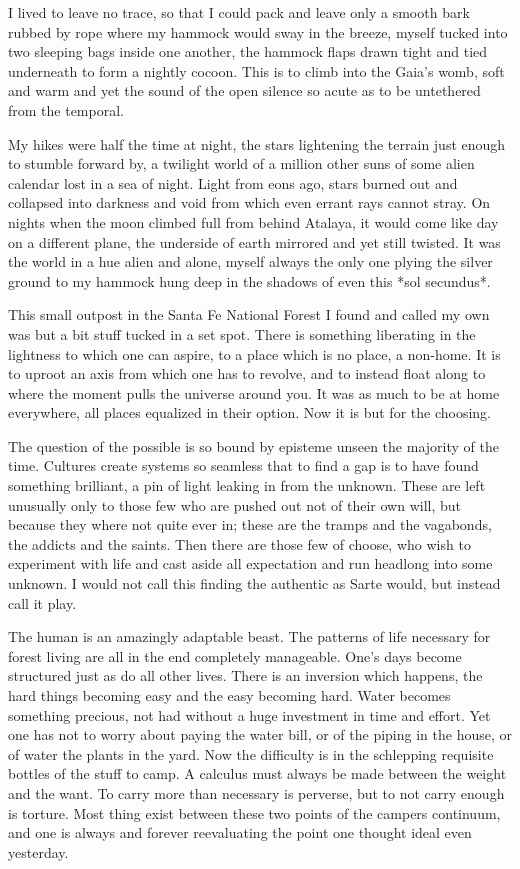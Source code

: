 \documentclass[ebook, 10pt, openright, onecolumn]{memoir}
\newcommand*\td[1]{
  \todo[inline]{
     #1 
  }
}
\newcommand*\finish{\td{ ----- Finish this section -----}}
\begin{document}
I lived to leave no trace, so that I could pack and leave only a smooth bark
rubbed by rope where my hammock would sway in the breeze, myself tucked into two
sleeping bags inside one another, the hammock flaps drawn tight and tied
underneath to form a nightly cocoon.  This is to climb into the Gaia's womb,
soft and warm and yet the sound of the open silence so acute as to be untethered
from the temporal.

My hikes were half the time at night, the stars lightening the terrain just
enough to stumble forward by, a twilight world of a million other suns of some
alien calendar lost in a sea of night.  Light from eons ago, stars burned out
and collapsed into darkness and void from which even errant rays cannot stray.
On nights when the moon climbed full from behind Atalaya, it would come like day
on a different plane, the underside of earth mirrored and yet still twisted.  It
was the world in a hue alien and alone, myself always the only one plying the
silver ground to my hammock hung deep in the shadows of even this *sol
secundus*.

This small outpost in the Santa Fe National Forest I found and called my own was
but a bit stuff tucked in a set spot.  There is something liberating in the
lightness to which one can aspire, to a place which is no place, a non-home.  It
is to uproot an axis from which one has to revolve, and to instead float along
to where the moment pulls the universe around you.  It was as much to be at home
everywhere, all places equalized in their option. Now it is but for the
choosing.  

\finish

The question of the possible is so bound by episteme unseen the majority of the
time.  Cultures create systems so seamless that to find a gap is to have found
something brilliant, a pin of light leaking in from the unknown.  These are left
unusually only to those few who are pushed out not of their own will, but
because they where not quite ever in; these are the tramps and the vagabonds,
the addicts and the saints.  Then there are those few of choose, who wish to
experiment with life and cast aside all expectation and run headlong into some
unknown.  I would not call this finding the authentic as Sarte would, but
instead call it play.

The human is an amazingly adaptable beast.  The patterns of life necessary for
forest living are all in the end completely manageable.  One's days become
structured just as do all other lives.  There is an inversion which happens, the
hard things becoming easy and the easy becoming hard.  Water becomes something
precious, not had without a huge investment in time and effort.  Yet one has not
to worry about paying the water bill, or of the piping in the house, or of water
the plants in the yard.  Now the difficulty is in the schlepping requisite
bottles of the stuff to camp.  A calculus must always be made between the weight
and the want.  To carry more than necessary is perverse, but to not carry enough
is torture.  Most thing exist between these two points of the campers continuum,
and one is always and forever reevaluating the point one thought ideal even
yesterday.
\end{document}
